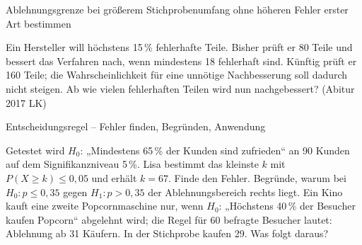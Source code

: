 \begin{aufgabe}{Ablehnungsgrenze bei größerem Stichprobenumfang ohne höheren Fehler erster Art bestimmen}
\begin{teile}
\teil Ein Hersteller will höchstens 15\,\% fehlerhafte Teile. Bisher prüft er 80 Teile und bessert das Verfahren nach, wenn mindestens 18 fehlerhaft sind. Künftig prüft er 160 Teile; die Wahrscheinlichkeit für eine unnötige Nachbesserung soll dadurch nicht steigen. Ab wie vielen fehlerhaften Teilen wird nun nachgebessert? \hfill (Abitur 2017 LK)
\end{teile}
\end{aufgabe}

\begin{aufgabe}{Entscheidungsregel – Fehler finden, Begründen, Anwendung}
\begin{teile}
\teil Getestet wird $H_0$: „Mindestens 65\,\% der Kunden sind zufrieden“ an 90 Kunden auf dem Signifikanzniveau 5\,\%. Lisa bestimmt das kleinste $k$ mit $P(X \ge k) \le 0{,}05$ und erhält $k = 67$. Finde den Fehler.
\teil Begründe, warum bei $H_0\colon p \le 0{,}35$ gegen $H_1\colon p > 0{,}35$ der Ablehnungsbereich rechts liegt.
\teil Ein Kino kauft eine zweite Popcornmaschine nur, wenn $H_0$: „Höchstens 40\,\% der Besucher kaufen Popcorn“ abgelehnt wird; die Regel für 60 befragte Besucher lautet: Ablehnung ab 31 Käufern. In der Stichprobe kaufen 29. Was folgt daraus?
\end{teile}
\end{aufgabe}

